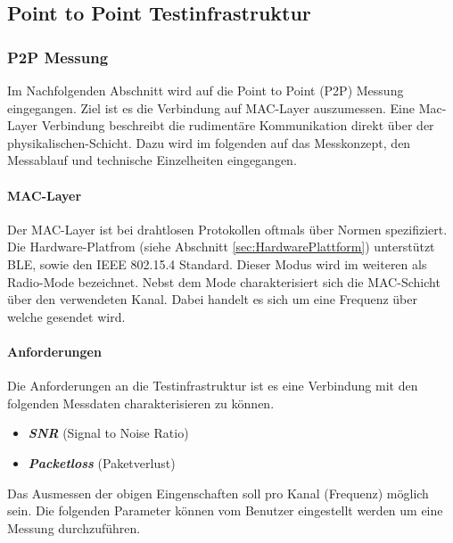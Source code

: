 \vspace*{4cm}
\begin{center}
\part{Point to Point Testinfrastruktur}\label{PointtoPointTestinfrastruktur}
\end{center}
\vspace*{\fill}
\clearpage

\section{P2P Messung}\label{sec:P2PMessung}

Im Nachfolgenden Abschnitt wird auf die Point to Point (P2P) Messung eingegangen. Ziel ist es die Verbindung auf MAC-Layer auszumessen. Eine Mac-Layer Verbindung beschreibt die rudimentäre Kommunikation direkt über der physikalischen-Schicht. Dazu wird im folgenden auf das Messkonzept, den Messablauf und technische Einzelheiten eingegangen. 

\subsection{MAC-Layer}\label{sec:MAC-LayerP2P}

Der MAC-Layer ist bei drahtlosen Protokollen oftmals über Normen spezifiziert. Die Hardware-Platfrom (siehe Abschnitt \ref{sec:HardwarePlattform}) unterstützt BLE, sowie den IEEE 802.15.4 Standard. Dieser Modus wird im weiteren als Radio-Mode bezeichnet. Nebst dem Mode charakterisiert sich die MAC-Schicht über den verwendeten Kanal. Dabei handelt es sich um eine Frequenz über welche gesendet wird. 

\subsection{Anforderungen}\label{sec:AnforderungentP2P}

Die Anforderungen an die Testinfrastruktur ist es eine Verbindung mit den folgenden Messdaten charakterisieren zu können. 

\begin{itemize}
	\item \textit{\textbf{SNR}} (Signal to Noise Ratio)
	\item \textit{\textbf{Packetloss}} (Paketverlust)
\end{itemize}

Das Ausmessen der obigen Eingenschaften soll pro Kanal (Frequenz) möglich sein. Die folgenden Parameter können vom Benutzer eingestellt werden um eine Messung durchzuführen.


